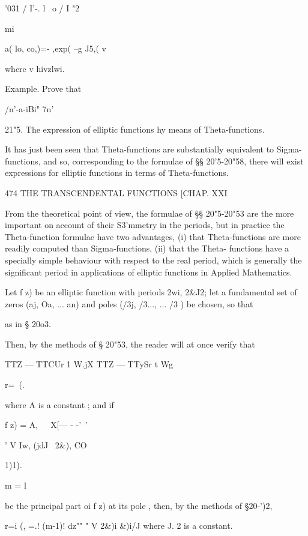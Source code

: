 '031 / I'-. l \ o / I  "2  



mi 



a( lo, co,)=- ,exp( --g J5,( v 

where v hivzlwi. 

Example. Prove that 

/n'-a-iBi" 7n'\ 

21"5. The expression of elliptic functions hy means of Theta-functions. 

It has just been seen that Theta-functions are substantially equivalent 
to Sigma-functions, and so, corresponding to the formulae of §§ 20'5-20"58, 
there will exist expressions for elliptic functions in terms of Theta-functions. 



474 THE TRANSCENDENTAL FUNCTIONS [CHAP. XXI 

From the theoretical point of view, the formulae of §§ 20"5-20"53 are the 
more important on account of their S3'mmetry in the periods, but in practice 
the Theta-function formulae have two advantages, (i) that Theta-functions 
are more readily computed than Sigma-functions, (ii) that the Theta- 
functions have a specially simple behaviour with respect to the real period, 
which is generally the significant period in applications of elliptic functions 
in Applied Mathematics. 

Let f z) be an elliptic function with periods 2wi, 2\&J2; let a fundamental 
set of zeros (aj, Oa, ... an) and poles (/3j, /3..., ... /3 ) be chosen, so that 



as in § 20o3. 

Then, by the methods of § 20"53, the reader will at once verify that 

TTZ — TTCUr 1 W.jX TTZ — TTySr t  Wg 

r=\ (.   

where A  is a constant ; and if 



f z) = A,\ \ \ X[— - -'~' \ \  %

' V Iw, (jdJ \ 2\&), CO 



1)1). 

m = l 

be the principal part oi f z) at its pole  , then, by the methods of §20-')2, 

r=i (, =.! (m-1)! dz"" " V 2\&)i \&)i/J 
where J. 2 is a constant. 

